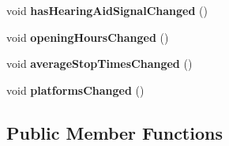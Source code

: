 \begin{DoxyCompactItemize}
void {\bfseries has\+Hearing\+Aid\+Signal\+Changed} ()
\item 
\mbox{\label{classStationEngine_1_1Station_a5859689456c15402abc729ba5c0043eb}} 
void {\bfseries opening\+Hours\+Changed} ()
\item 
\mbox{\label{classStationEngine_1_1Station_a4430aeea8a5cb2f88a33ed83906e2daa}} 
void {\bfseries average\+Stop\+Times\+Changed} ()
\item 
\mbox{\label{classStationEngine_1_1Station_abef14b603790b897d6c6fa6a0bd59636}} 
void {\bfseries platforms\+Changed} ()
\end{DoxyCompactItemize}
\subsection*{Public Member Functions}
